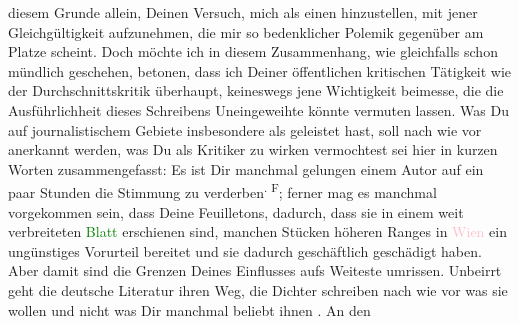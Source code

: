                diesem Grunde allein, Deinen Versuch, mich als einen \label{K_L03521-9v}\label{K_L03521-9h} hinzustellen, mit jener Gleichgültigkeit aufzunehmen, die mir so bedenklicher
               Polemik gegenüber am Platze scheint. Doch möchte ich in diesem Zusammenhang, wie
               gleichfalls schon mündlich geschehen, betonen, dass ich Deiner öffentlichen
               kritischen Tätigkeit wie der Durchschnittskritik überhaupt, keineswegs jene
               Wichtigkeit beimesse, die die Ausführlichheit dieses Schreibens Uneingeweihte könnte
               vermuten lassen. Was Du auf journalistischem Gebiete insbesondere als \label{K_L03521-10v}\label{K_L03521-10h}
               geleistet hast, soll nach wie vor anerkannt werden, was Du als Kritiker zu wirken
               vermochtest sei hier in kurzen Worten zusammengefasst: Es ist Dir manchmal gelungen
               einem Autor auf ein paar Stunden die Stimmung zu verderben\substVorne{}\textsuperscript{. F}\substDazwischen{}; f\substHinten{}erner mag es manchmal vorgekommen sein, dass Deine Feuilletons, dadurch, dass
               sie in einem weit verbreiteten \textcolor{green}{Blatt}{}\ledrightnote{{$\rightarrow$}\textcolor{green}{Neue Freie Presse}} erschienen sind, manchen Stücken höheren Ranges in \textcolor{pink}{Wien}{}\ledrightnote{\textcolor{pink}{Wien}} ein ungünstiges Vorurteil bereitet und sie dadurch
               geschäftlich geschädigt haben. Aber {\pb}damit sind die Grenzen Deines Einflusses aufs Weiteste umrissen. Unbeirrt geht die
               deutsche Literatur ihren Weg, die Dichter schreiben nach wie vor was sie wollen und
               nicht was Dir manchmal beliebt ihnen \label{K_L03521-11v}\label{K_L03521-11h}. An den
